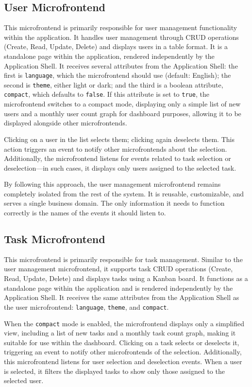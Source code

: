 \subsection{User Microfrontend}
This microfrontend is primarily responsible for user management functionality within the application. It handles user management through CRUD operations (Create, Read, Update, Delete) and displays users in a table format. It is a standalone page within the application, rendered independently by the Application Shell. It receives several attributes from the Application Shell: the first is \texttt{language}, which the microfrontend should use (default: English); the second is \texttt{theme}, either light or dark; and the third is a boolean attribute, \texttt{compact}, which defaults to \texttt{false}. If this attribute is set to \texttt{true}, the microfrontend switches to a compact mode, displaying only a simple list of new users and a monthly user count graph for dashboard purposes, allowing it to be displayed alongside other microfrontends.

Clicking on a user in the list selects them; clicking again deselects them. This action triggers an event to notify other microfrontends about the selection. Additionally, the microfrontend listens for events related to task selection or deselection—in such cases, it displays only users assigned to the selected task.

By following this approach, the user management microfrontend remains completely isolated from the rest of the system. It is reusable, customizable, and serves a single business domain. The only information it needs to function correctly is the names of the events it should listen to.

\subsection{Task Microfrontend}
This microfrontend is primarily responsible for task management. Similar to the user management microfrontend, it supports task CRUD operations (Create, Read, Update, Delete) and displays tasks using a Kanban board. It functions as a standalone page within the application and is rendered independently by the Application Shell. It receives the same attributes from the Application Shell as the user microfrontend: \texttt{language}, \texttt{theme}, and \texttt{compact}.

When the \texttt{compact} mode is enabled, the microfrontend displays only a simplified view, including a list of new tasks and a monthly task count graph, making it suitable for use within the dashboard. Clicking on a task selects or deselects it, triggering an event to notify other microfrontends of the selection. Additionally, this microfrontend listens for user selection and deselection events. When a user is selected, it filters the displayed tasks to show only those assigned to the selected user.

